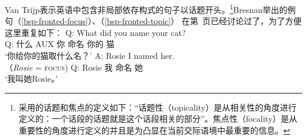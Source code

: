 Van Trijp表示英语中包含非局部依存构式的句子以话题开头。\footnote{
采用的话题和焦点的定义如下：“话题性（topicality）是从相关性的角度进行定义的：一个话段的话题就是这个话段相关的部分”。焦点性（focality）是从重要性的角度进行定义的并且是为凸显在当前交际语境中最重要的信息。
}Bresnan举出的例句（\ref{bsp-fronted-focus}）、（\ref{bsp-fronted-topic}） 在第~\pageref{bsp-fronted-focus}页\citep[]{Bresnan2001a}已经讨论过了，为了方便这里重复如下：
\ea
\label{bsp-fronted-focus-two}
\gll Q: What did you name your cat?\\  
     Q: 什么 AUX 你 命名 你的 猫\\
\glt `你给你的猫取什么名？'
\gll A: Rosie I named her. \\    （\emph{Rosie} = \textsc{focus})
     Q: Rosie 我 命名 她\\
\glt `我叫她Rosie。'
